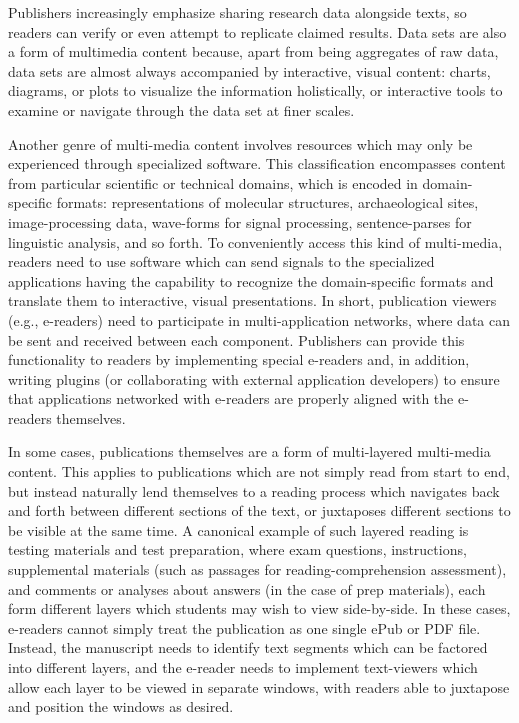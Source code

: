 \documentclass[10pt,letterpaper]{article}
\begin{document}
{{\begin{description}[leftmargin=2pt,
	labelindent=-2pt,labelsep=12pt]
\item[Data Sets and Data Visualization]  Publishers 
increasingly emphasize sharing research data alongside 
texts, so readers can verify or even attempt to 
replicate claimed results.  Data sets are also a form 
of multimedia content because, apart from being aggregates 
of raw data, data sets are almost always accompanied 
by interactive, visual content: charts, diagrams, or 
plots to visualize the information holistically, or 
interactive tools to examine or navigate through the 
data set at finer scales.  

\item[Application Networks]  Another genre of multi-media 
content involves resources which may only be experienced 
through specialized software.  This classification encompasses 
content from particular scientific or technical domains, 
which is encoded in domain-specific formats: representations 
of molecular structures, archaeological sites, image-processing 
data, wave-forms for signal processing, sentence-parses for 
linguistic analysis, and so forth.  To conveniently access 
this kind of multi-media, readers need to use software 
which can send signals to the specialized applications 
having the capability to recognize the domain-specific 
formats and translate them to interactive, 
visual presentations.  In short, publication viewers 
(e.g., e-readers) need to participate in multi-application 
networks, where data can be sent and received between 
each component.  Publishers can provide this 
functionality to readers by implementing special 
e-readers and, in addition, writing plugins 
(or collaborating with external application developers) 
to ensure that applications networked with e-readers 
are properly aligned with the e-readers themselves.

\item[Publications-as-Applications]  In some 
cases, publications themselves are a form of 
multi-layered multi-media content.  This applies 
to publications which are not simply read from 
start to end, but instead naturally lend 
themselves to a reading process which navigates 
back and forth between different sections of 
the text, or juxtaposes different sections to be 
visible at the same time.  A canonical example 
of such layered reading is testing materials 
and test preparation, where exam questions, 
instructions, supplemental materials (such 
as passages for reading-comprehension 
assessment), and comments or analyses about 
answers (in the case of prep materials), 
each form different layers which 
students may wish to view side-by-side.  
In these cases, e-readers cannot simply 
treat the publication as one single ePub 
or PDF file.  Instead, the manuscript needs 
to identify text segments which can be factored 
into different layers, and the e-reader 
needs to implement text-viewers which allow 
each layer to be viewed in separate windows, 
with readers able to juxtapose and position the 
windows as desired. 
\end{description}\vspace{-2em}
}


}
\end{document}
